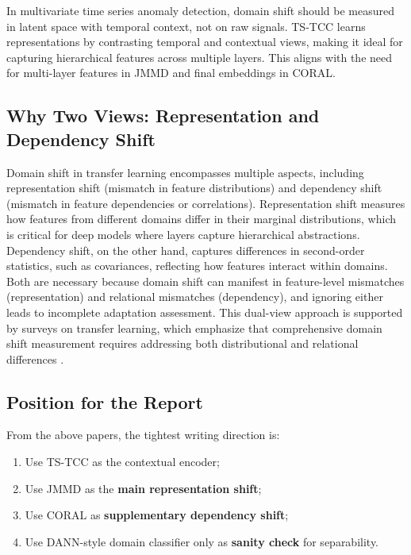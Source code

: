 \documentclass[a4paper]{article}
\begin{document}
In multivariate time series anomaly detection, domain shift should be measured in latent space with temporal context, not on raw signals. TS-TCC \cite{tstcc} learns representations by contrasting temporal and contextual views, making it ideal for capturing hierarchical features across multiple layers. This aligns with the need for multi-layer features in JMMD and final embeddings in CORAL.

\subsection{Why Two Views: Representation and Dependency Shift}

Domain shift in transfer learning encompasses multiple aspects, including representation shift (mismatch in feature distributions) and dependency shift (mismatch in feature dependencies or correlations). Representation shift measures how features from different domains differ in their marginal distributions, which is critical for deep models where layers capture hierarchical abstractions. Dependency shift, on the other hand, captures differences in second-order statistics, such as covariances, reflecting how features interact within domains. Both are necessary because domain shift can manifest in feature-level mismatches (representation) and relational mismatches (dependency), and ignoring either leads to incomplete adaptation assessment. This dual-view approach is supported by surveys on transfer learning, which emphasize that comprehensive domain shift measurement requires addressing both distributional and relational differences \cite{pan2010survey}.

\subsection{Position for the Report}

From the above papers, the tightest writing direction is:
\begin{enumerate}[label=\arabic*.]
    \item Use TS-TCC as the contextual encoder;
    \item Use JMMD as the \textbf{main representation shift};
    \item Use CORAL as \textbf{supplementary dependency shift};
    \item Use DANN-style domain classifier only as \textbf{sanity check} for separability.
\end{enumerate}
\end{document}
